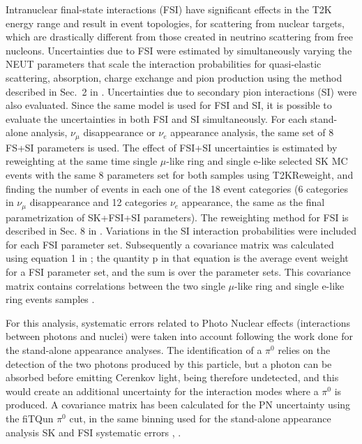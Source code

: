 \begin{enumerate}
Intranuclear final-state interactions (FSI) have significant effects in the T2K energy range and
result in event topologies, for scattering from nuclear targets, which are drastically different from 
those created in neutrino scattering from free nucleons.
Uncertainties due to FSI were estimated by simultaneously varying the NEUT parameters that scale the interaction probabilities for quasi-elastic 
scattering, absorption, charge exchange and pion production using the method described in Sec.\ 2 in \cite{NIWGErr}. 
Uncertainties due to secondary pion interactions (SI) were also evaluated. Since the same model is used for FSI and SI, it is possible to evaluate the uncertainties in both FSI and SI simultaneously. 
For each stand-alone analysis, $\nu_{\mu}$ disappearance or $\nu_{e}$ appearance analysis, the same set of 8 FS+SI  parameters is used. 
The effect of FSI+SI uncertainties is estimated by reweighting at the same time single $\mu$-like ring and single e-like selected SK MC events 
with the same 8 parameters set for both samples using T2KReweight, and finding the number of events in each one of the 18 event categories 
(6 categories in $\nu_{\mu}$ disappearance and 12 categories $\nu_{e}$ appearance, the same as the final parametrization of SK+FSI+SI parameters).
The reweighting method for FSI is described in Sec. 8 in \cite{NEUTnuclear}. Variations in the SI interaction probabilities were included for each FSI parameter set. 
Subsequently a covariance matrix was calculated using equation 1 in \cite{NIWGErr}; the quantity p in that equation is the average event weight for a FSI parameter set, and 
the sum is over the parameter sets. This covariance matrix contains correlations between the two single $\mu$-like ring and single e-like ring events samples \cite{ikeda}.

For this analysis, systematic errors related to Photo Nuclear effects (interactions between photons and nuclei) were taken into account following the work done for the stand-alone appearance analyses. The identification of a $\pi^0$ relies on the detection of the two photons produced by this particle, but a photon can be absorbed before emitting Cerenkov light, being therefore undetected, and this would create an additional uncertainty for the interaction modes where a $\pi^0$ is produced. 
A covariance matrix has been calculated for the PN uncertainty using the fiTQun $\pi^0$ cut, in the same binning used for the stand-alone appearance analysis SK and FSI systematic errors \cite{2013nueptheta}, \cite{2013nuenergy}.


\end{enumerate}
